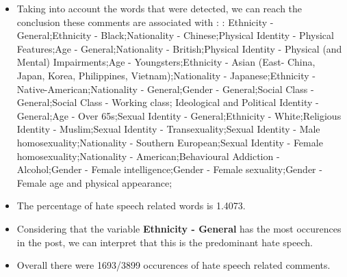 \documentclass[11pt]{article}
\begin{document}
\begin{itemize}\item Taking into account the words that were detected, we can reach the conclusion these comments are associated with : : Ethnicity - General;Ethnicity - Black;Nationality - Chinese;Physical Identity - Physical Features;Age - General;Nationality - British;Physical Identity - Physical (and Mental) Impairments;Age - Youngsters;Ethnicity - Asian (East- China, Japan, Korea, Philippines, Vietnam);Nationality - Japanese;Ethnicity - Native-American;Nationality - General;Gender - General;Social Class - General;Social Class - Working class; Ideological and Political Identity - General;Age - Over 65s;Sexual Identity - General;Ethnicity - White;Religious Identity - Muslim;Sexual Identity - Transexuality;Sexual Identity - Male homosexuality;Nationality - Southern European;Sexual Identity - Female homosexuality;Nationality - American;Behavioural Addiction - Alcohol;Gender - Female intelligence;Gender - Female sexuality;Gender - Female age and physical appearance;%

\item The percentage of hate speech related words is 1.4073.

\item Considering that the variable \textbf{Ethnicity - General} has the most occurences in the post, we can interpret that this is the predominant hate speech.

\item Overall there were 1693/3899 occurences of hate speech related comments.\end{itemize}
\end{document}
